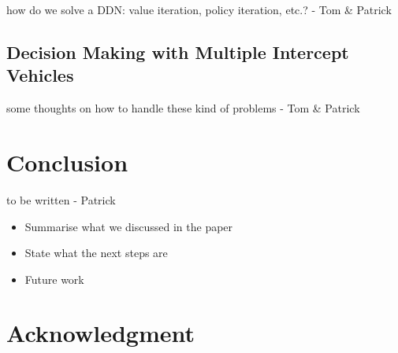 \documentclass[conference]{IEEEtran}
\begin{document}
{\red how do we solve a DDN: value iteration, policy iteration, etc.? - Tom \& Patrick}



\subsection{Decision Making with Multiple Intercept Vehicles}


{\red some thoughts on how to handle these kind of problems - Tom \& Patrick}



\section{Conclusion}

{\red to be written - Patrick}

\begin{itemize}
\item Summarise what we discussed in the paper
\item State what the next steps are
\item Future work
\end{itemize}







\section*{Acknowledgment}
\end{document}
